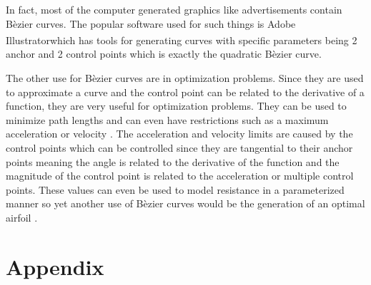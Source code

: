 \documentclass[12pt, letterpaper]{article}
\begin{document}
In fact, most of the computer generated graphics like advertisements contain B\`ezier curves. The popular
software used for such things is Adobe Illustrator\textsuperscript\textregistered which has tools for
generating curves with specific parameters being 2 anchor and 2 control points which is exactly the
quadratic B\`ezier curve. 

The other use for B\`ezier curves are in optimization problems. Since they are used to approximate a 
curve and the control point can be related to the derivative of a function, they are very useful for
optimization problems. They can be used to minimize path lengths \citep{bezierPaths} and can even have
restrictions such as a maximum acceleration or velocity \citep{bezierSoccerPaths}. The acceleration and
velocity limits are caused by the control points which can be controlled since they are tangential to
their anchor points meaning the angle is related to the derivative of the function and the magnitude of
the control point is related to the acceleration or multiple control points. These values can even be 
used to model resistance in a parameterized manner so yet another use of B\`ezier curves would be the
generation of an optimal airfoil \citep{bezierAirfoil}.



\newpage
\section{Appendix}

\newpage

\end{document}
